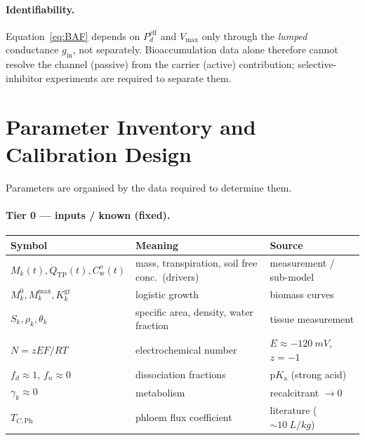 \documentclass[12pt,a4paper]{article}
\newcommand{\Cw}{C_{\mathrm{w}}}
\begin{document}
\paragraph{Identifiability.}  Equation~\eqref{eq:BAF} depends on $P_d^{\mathrm{eff}}$ and $V_{\max}$ only through the \emph{lumped} conductance $g_\mathrm{in}$, not separately.  Bioaccumulation data alone therefore cannot resolve the channel (passive) from the carrier (active) contribution; selective-inhibitor experiments are required to separate them.


\section{Parameter Inventory and Calibration Design}\label{sec:params}

Parameters are organised by the data required to determine them.

\paragraph{Tier 0 --- inputs / known (fixed).}
\begin{center}
\renewcommand{\arraystretch}{1.25}
\begin{tabular}{@{}p{4.4cm}p{6.2cm}p{3.6cm}@{}}
\toprule
\textbf{Symbol} & \textbf{Meaning} & \textbf{Source} \\
\midrule
$M_k(t),\dot Q_\mathrm{TP}(t),\Cw^{o}(t)$ & mass, transpiration, soil free conc.\ (drivers) & measurement / sub-model \\
$M_k^0,M_k^\mathrm{max},K_k^\mathrm{gr}$ & logistic growth & biomass curves \\
$S_k,\rho_k,\theta_k$ & specific area, density, water fraction & tissue measurement \\
$N=zEF/RT$ & electrochemical number & $E\approx-\SI{120}{mV}$, $z=-1$ \\
$f_d\approx1,\,f_n\approx0$ & dissociation fractions & $\mathrm{p}K_\mathrm{a}$ (strong acid) \\
$\gamma_k\approx0$ & metabolism & recalcitrant $\to0$ \\
$T_{C,\mathrm{Ph}}$ & phloem flux coefficient & literature ($\sim\SI{10}{L/kg}$) \\
\bottomrule
\end{tabular}
\end{center}
\end{document}

